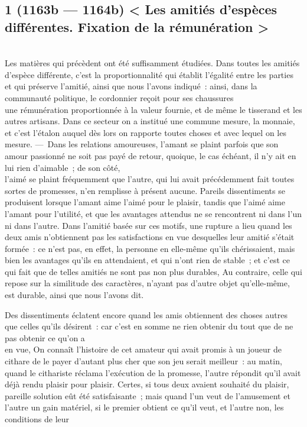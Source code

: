 \documentclass[french,twoside]{book} %
\begin{document}
\subsection[{1 (1163b — 1164b) < Les amitiés d’espèces différentes. Fixation de la rémunération >}]{1 (1163b — 1164b) < Les amitiés d’espèces différentes. Fixation de la rémunération >}
\noindent \\
Les matières qui précèdent ont été suffisamment étudiées. Dans toutes les amitiés d’espèce différente, c’est la proportionnalité qui établit l’égalité entre les parties et qui préserve l’amitié, ainsi que nous l’avons indiqué : ainsi, dans la communauté politique, le cordonnier reçoit pour ses chaussures \\
une rémunération proportionnée à la valeur fournie, et de  même le tisserand et les autres artisans. Dans ce secteur on a institué une commune mesure, la monnaie, et c’est l’étalon auquel dès lors on rapporte toutes choses et avec lequel on les mesure. — Dans les relations amoureuses, l’amant se plaint parfois que son amour passionné ne soit pas payé de retour, quoique, le cas échéant, il n’y ait en lui rien d’aimable ; de son côté, \\
l’aimé se plaint fréquemment que l’autre, qui lui avait précédemment fait toutes sortes de promesses, n’en remplisse à présent aucune. Pareils dissentiments se produisent lorsque l’amant aime l’aimé pour le plaisir, tandis que l’aimé aime l’amant pour l’utilité, et que les avantages attendus ne se rencontrent ni dans l’un ni dans l’autre. Dans l’amitié basée sur ces motifs, une rupture a lieu quand les deux amis n’obtiennent pas les satisfactions en vue desquelles leur amitié s’était \\
formée : ce n’est pas, en effet, la personne en elle-même qu’ils chérissaient, mais bien les avantages qu’ils en attendaient, et qui n’ont rien de stable ; et c’est ce qui fait que de telles amitiés ne sont pas non plus durables, Au contraire, celle qui repose sur la similitude des caractères, n’ayant pas d’autre objet qu’elle-même, est durable, ainsi que nous l’avons dit.\par
Des dissentiments éclatent encore quand les amis obtiennent des choses autres que celles qu’ils désirent : car c’est en somme ne rien obtenir du tout que de ne pas obtenir ce qu’on a \\
en vue, On connaît l’histoire de cet amateur qui avait promis à un joueur de cithare de le payer d’autant plus cher que son jeu serait meilleur : au matin, quand le cithariste réclama l’exécution de la promesse, l’autre répondit qu’il avait déjà rendu plaisir pour plaisir. Certes, si tous deux avaient souhaité du plaisir, pareille solution eût été satisfaisante ; mais quand l’un veut de l’amusement et l’autre un gain matériel, si le premier obtient ce qu’il veut, et l’autre non, les conditions de leur \\
\end{document}
